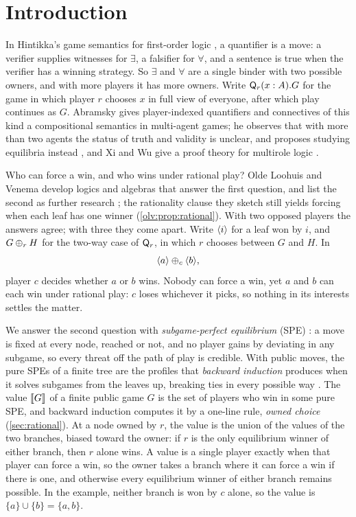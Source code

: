 \section{Introduction}

In Hintikka's game semantics for first-order logic \cite{Hintikka1973}, a quantifier is a move: a verifier supplies witnesses for $\exists$, a falsifier for $\forall$, and a sentence is true when the verifier has a winning strategy. So $\exists$ and $\forall$ are a single binder with two possible owners, and with more players it
has more owners. Write $\mathsf Q_r(x:A).G$ for the game in which player $r$ chooses $x$ in full view of everyone, after which play continues as $G$. Abramsky gives player-indexed quantifiers and connectives of this kind a compositional semantics in multi-agent games; he observes that with more than two
agents the status of truth and validity is unclear, and proposes studying equilibria instead \cite{Abramsky2007}, and Xi and Wu give a proof theory for multirole logic \cite{XiWu2023}.

Who can force a win, and who wins under rational play? Olde Loohuis and Venema develop logics and algebras that answer the first question, and list the second as further research \cite{OldeLoohuisVenema2010}; the rationality clause they sketch still yields forcing when each leaf has one winner (\cref{olv:prop:rational}). With two opposed players the answers agree; with three they come apart. Write $\langle i\rangle$ for a leaf won by $i$, and $G\mathbin{\oplus_{r}} H$ for the two-way case of $\mathsf Q_r$, in which $r$ chooses between $G$ and $H$. In
\[
 \langle a\rangle\mathbin{\oplus_{c}}\langle b\rangle,
\]
player $c$ decides whether $a$ or $b$ wins. Nobody can force a win, yet $a$ and $b$ can each win under rational play: $c$ loses whichever it picks, so nothing in its interests settles the matter.

We answer the second question with \emph{subgame-perfect equilibrium} (SPE) \cite{Selten1965}: a move is fixed at every node, reached or not, and no player gains by deviating in any subgame, so every threat off the path of play is credible. With public moves, the pure SPEs of a finite tree are the profiles that \emph{backward induction} produces when it solves subgames from the leaves up, breaking ties in every possible way \cite{FudenbergTirole1991}. The value $\llbracket G\rrbracket$ of a finite public game $G$ is
the set of players who win in some pure SPE, and backward induction computes it by a one-line rule, \emph{owned choice} (\cref{sec:rational}). At a node owned by $r$, the value is the union of the values of the two branches, biased toward the owner: if $r$ is the only equilibrium winner of either branch, then $r$ alone wins. A value is a single player exactly when that player can force a win, so the owner takes a branch where it can force a win if there is one, and otherwise every equilibrium winner of either branch remains possible. In the example, neither branch is won by $c$ alone, so the value is $\{a\}\cup\{b\}=\{a,b\}$.

